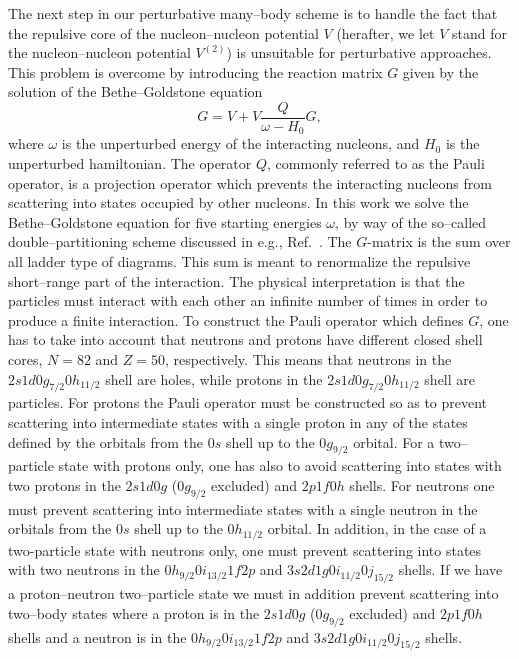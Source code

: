 The next step 
in our perturbative many--body scheme is to handle 
the fact that the repulsive core of the nucleon--nucleon potential $V$
(herafter, we let $V$ stand for the nucleon--nucleon potential
$V^{(2)}$)
is unsuitable for perturbative approaches. This problem is overcome
by introducing the reaction matrix $G$ given by the solution of the
Bethe--Goldstone equation
\begin{equation}
    G=V+V\frac{Q}{\omega - H_0}G,
\end{equation}
where $\omega$ is the unperturbed energy of the interacting nucleons,
and $H_0$ is the unperturbed hamiltonian. 
The operator $Q$, commonly referred to
as the Pauli operator, is a projection operator which prevents the
interacting nucleons from scattering into states occupied by other nucleons.
In this work we solve the Bethe--Goldstone equation for five starting
energies $\omega$, by way of the so--called double--partitioning scheme
discussed in e.g.,  Ref.\ \cite{hko95}. 
The $G$-matrix is the sum over all
ladder type of diagrams. This sum is meant to renormalize
the repulsive short--range part of the interaction. The physical interpretation
is that the particles must interact with each other an infinite number
of times in order to produce a finite interaction. 
To construct the Pauli operator which defines $G$, one has to take 
into account that neutrons and protons have different closed shell
cores, $N=82$ and $Z=50$, respectively.
This means that neutrons in the $2s1d0g_{7/2}0h_{11/2}$ shell
are holes, while protons in the $2s1d0g_{7/2}0h_{11/2}$ shell
are particles. For protons the  Pauli operator must be constructed so as to
prevent scattering into intermediate states with a single
proton in any of the
states defined by the orbitals from the $0s$ shell up to the
$0g_{9/2}$ orbital. For a two--particle state with protons only, one has 
also to avoid scattering into states with two protons in the $2s1d0g$ 
($0g_{9/2}$ excluded) and $2p1f0h$ shells. For neutrons one must
prevent scattering into intermediate states with a single neutron
in the orbitals from the $0s$ shell up to the
$0h_{11/2}$ orbital. In addition, in the case of a two-particle
state with neutrons only, one must prevent scattering into states
with two neutrons in the $0h_{9/2}0i_{13/2}1f2p$ and 
$3s2d1g0i_{11/2}0j_{15/2}$ shells. 
If we have a proton--neutron two--particle state we must in addition prevent
scattering into two--body states where a proton is in 
the $2s1d0g$ ($0g_{9/2}$ excluded)
and $2p1f0h$ shells and a neutron is in the 
$0h_{9/2}0i_{13/2}1f2p$ and $3s2d1g0i_{11/2}0j_{15/2}$ shells.

